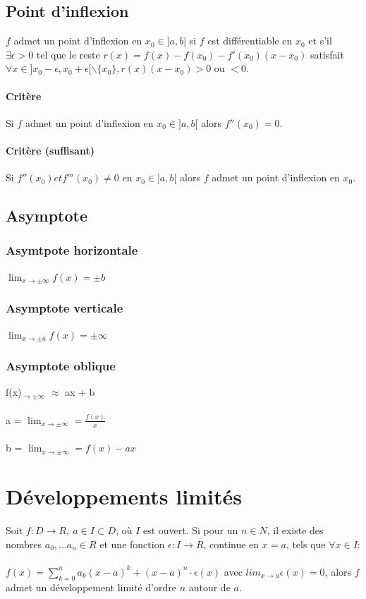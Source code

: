 \documentclass{article}
\begin{document}
\subsection{Point d'inflexion}

$ f $ admet un point d'inflexion en $ x_0 \in ]a, b[ $ si $ f $ est différentiable en $ x_0 $ et s'il $ \exists \epsilon > 0 $ tel que le reste $ r(x) = f(x) - f(x_0) - f'(x_0) (x-x_0)$ satisfait $ \forall x \in ]x_0 - \epsilon, x_0 + \epsilon [ \backslash \{x_0\}, r(x)(x-x_0) > 0 $ ou $ < 0$.

\paragraph{Critère} Si $ f $ admet un point d'inflexion en $ x_0 \in ]a, b[$ alors $ f''(x_0) = 0$.

\paragraph{Critère (suffisant)} Si $ f''(x_0) et f'''(x_0) \neq 0 $ en $ x_0 \in ]a, b[$ alors $f $ admet un point d'inflexion en $ x_0 $.   
\subsection{Asymptote}
\subsubsection{Asymtpote horizontale}
$\lim_{x\to \pm \infty}f(x) = \pm b$
\subsubsection{Asymptote verticale}
$\lim_{x\to \pm a}f(x) = \pm\infty$
\subsubsection{Asymptote oblique}
f(x)$_{\to \pm \infty}$ $\approx$ ax + b\\\\
a = $\lim_{x\to \pm \infty} = \frac{f(x)}{x}$\\\\
b = $\lim_{x\to \pm \infty} = f(x) - ax$

\section{Développements limités}

Soit $ f : D \to R,\ a \in I \subset D $, où $ I $ est ouvert. Si pour un $ n \in N $, il existe des nombres $ a_0, ... a_n \in R $ et une fonction $ \epsilon : I \to R $, continue en $ x = a $, tels que $ \forall x \in I $:\\\\
$ f(x) = \sum_{k=0}^{n} a_k (x-a)^k + (x-a)^n \cdot \epsilon(x)$ avec $ lim_{x\to{a}} \epsilon(x) = 0 $, alors $ f $ admet un développement limité d'ordre $ n $ autour de $ a $.
\end{document}
